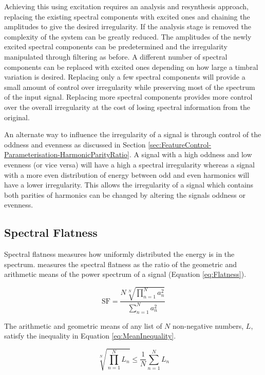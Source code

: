 			Achieving this using excitation requires an analysis and resynthesis approach, replacing the
			existing spectral components with excited ones and chaining the amplitudes to give the desired
			irregularity.  If the analysis stage is removed the complexity of the system can be greatly
			reduced. The amplitudes of the newly excited spectral components can be predetermined and the
			irregularity manipulated through filtering as before. A different number of spectral components can
			be replaced with excited ones depending on how large a timbral variation is desired. Replacing only
			a few spectral components will provide a small amount of control over irregularity while preserving
			most of the spectrum of the input signal. Replacing more spectral components provides more control
			over the overall irregularity at the cost of losing spectral information from the original.

			An alternate way to influence the irregularity of a signal is through control of the oddness and
			evenness as discussed in Section \ref{sec:FeatureControl-Parameterisation-HarmonicParityRatio}. A
			signal with a high oddness and low evenness (or vice versa) will have a high a spectral
			irregularity whereas a signal with a more even distribution of energy between odd and even
			harmonics will have a lower irregularity. This allows the irregularity of a signal which contains
			both parities of harmonics can be changed by altering the signals oddness or evenness.

	\subsection{Spectral Flatness}
	\label{sec:FeatureControl-Parameterisation-Flatness}
		Spectral flatness measures how uniformly distributed the energy is in the spectrum.
		\citet{johnston1988transform} measures the spectral flatness as the ratio of the geometric and arithmetic
		means of the power spectrum of a signal (Equation \ref{eq:Flatness}).

		\begin{equation}
			\textrm{SF} = \frac{N\sqrt[N]{\prod_{n = 1}^{N} a_{n}^{2}}}
				           {\sum_{n = 1}^{N} a_{n}^{2}}
			\label{eq:Flatness}
		\end{equation}

		The arithmetic and geometric means of any list of $N$ non-negative numbers, $L$, satisfy the inequality in
		Equation \ref{eq:MeanInequality}.

		\begin{equation}
			\sqrt[N]{\prod_{n = 1}^{N} L_{n}} \leq \frac{1}{N} \sum_{n = 1}^{N} L_{n}
			\label{eq:MeanInequality}
		\end{equation}

